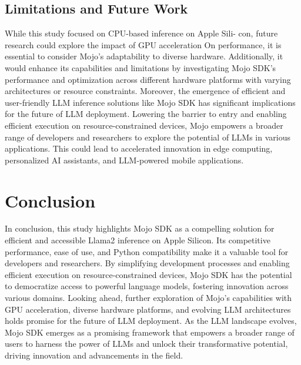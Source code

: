 \documentclass[conference]{IEEEtran}
\begin{document}
\subsection{Limitations and Future Work}
While this study focused on CPU-based inference on Apple Sili- con, future research could explore the impact of GPU acceleration On performance, it is essential to consider Mojo's adaptability to diverse hardware. Additionally, it would enhance its capabilities and limitations by investigating Mojo SDK's performance and optimization across different hardware platforms with varying architectures or resource constraints. Moreover, the emergence of efficient and user-friendly LLM inference solutions like Mojo SDK has significant implications for the future of LLM deployment. Lowering the barrier to entry and enabling efficient execution on resource-constrained devices, Mojo empowers a broader range of developers and researchers to explore the potential of LLMs in various applications. This could lead to accelerated innovation in edge computing, personalized AI assistants, and LLM-powered mobile applications.

\section{Conclusion}
In conclusion, this study highlights Mojo SDK as a compelling solution for efficient and accessible Llama2 inference on Apple Silicon. Its competitive performance, ease of use, and Python compatibility make it a valuable tool for developers and researchers. By simplifying development processes and enabling efficient execution on resource-constrained devices, Mojo SDK has the potential to democratize access to powerful language models, fostering innovation across various domains. Looking ahead, further exploration of Mojo's capabilities with GPU acceleration, diverse hardware platforms, and evolving LLM architectures holds promise for the future of LLM deployment. As the LLM landscape evolves, Mojo SDK emerges as a promising framework that empowers a broader range of users to harness the power of LLMs and unlock their transformative potential, driving innovation and advancements in the field.
\end{document}
